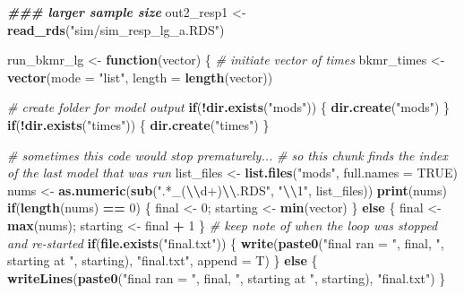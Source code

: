 \documentclass[12pt, twoside]{amherstthesis}
\newenvironment{Shaded}{\begin{snugshade}}{\end{snugshade}}
\newcommand{\AttributeTok}[1]{\textcolor[rgb]{0.13,0.29,0.53}{#1}}
\newcommand{\CommentTok}[1]{\textcolor[rgb]{0.56,0.35,0.01}{\textit{#1}}}
\newcommand{\ConstantTok}[1]{\textcolor[rgb]{0.56,0.35,0.01}{#1}}
\newcommand{\ControlFlowTok}[1]{\textcolor[rgb]{0.13,0.29,0.53}{\textbf{#1}}}
\newcommand{\DecValTok}[1]{\textcolor[rgb]{0.00,0.00,0.81}{#1}}
\newcommand{\DocumentationTok}[1]{\textcolor[rgb]{0.56,0.35,0.01}{\textbf{\textit{#1}}}}
\newcommand{\FunctionTok}[1]{\textcolor[rgb]{0.13,0.29,0.53}{\textbf{#1}}}
\newcommand{\NormalTok}[1]{#1}
\newcommand{\OtherTok}[1]{\textcolor[rgb]{0.56,0.35,0.01}{#1}}
\newcommand{\SpecialCharTok}[1]{\textcolor[rgb]{0.81,0.36,0.00}{\textbf{#1}}}
\newcommand{\StringTok}[1]{\textcolor[rgb]{0.31,0.60,0.02}{#1}}
\begin{document}
\scriptsize
\begin{Shaded}
\begin{Highlighting}[]
\DocumentationTok{\#\#\# larger sample size}
\NormalTok{out2\_resp1 }\OtherTok{\textless{}{-}} \FunctionTok{read\_rds}\NormalTok{(}\StringTok{"sim/sim\_resp\_lg\_a.RDS"}\NormalTok{)}

\NormalTok{run\_bkmr\_lg }\OtherTok{\textless{}{-}} \ControlFlowTok{function}\NormalTok{(vector) \{}
  \CommentTok{\# initiate vector of times}
\NormalTok{  bkmr\_times }\OtherTok{\textless{}{-}} \FunctionTok{vector}\NormalTok{(}\AttributeTok{mode =} \StringTok{"list"}\NormalTok{, }\AttributeTok{length =} \FunctionTok{length}\NormalTok{(vector))}
  
  \CommentTok{\# create folder for model output}
  \ControlFlowTok{if}\NormalTok{(}\SpecialCharTok{!}\FunctionTok{dir.exists}\NormalTok{(}\StringTok{"mods"}\NormalTok{)) \{}
    \FunctionTok{dir.create}\NormalTok{(}\StringTok{"mods"}\NormalTok{)}
\NormalTok{  \}}
  \ControlFlowTok{if}\NormalTok{(}\SpecialCharTok{!}\FunctionTok{dir.exists}\NormalTok{(}\StringTok{"times"}\NormalTok{)) \{}
    \FunctionTok{dir.create}\NormalTok{(}\StringTok{"times"}\NormalTok{)}
\NormalTok{  \}}
  
  \CommentTok{\# sometimes this code would stop prematurely...}
  \CommentTok{\# so this chunk finds the index of the last model that was run}
\NormalTok{  list\_files }\OtherTok{\textless{}{-}} \FunctionTok{list.files}\NormalTok{(}\StringTok{"mods"}\NormalTok{, }\AttributeTok{full.names =} \ConstantTok{TRUE}\NormalTok{)}
\NormalTok{  nums }\OtherTok{\textless{}{-}} \FunctionTok{as.numeric}\NormalTok{(}\FunctionTok{sub}\NormalTok{(}\StringTok{".*\_(}\SpecialCharTok{\textbackslash{}\textbackslash{}}\StringTok{d+)}\SpecialCharTok{\textbackslash{}\textbackslash{}}\StringTok{.RDS"}\NormalTok{, }\StringTok{"}\SpecialCharTok{\textbackslash{}\textbackslash{}}\StringTok{1"}\NormalTok{, list\_files))}
  \FunctionTok{print}\NormalTok{(nums)}
  \ControlFlowTok{if}\NormalTok{(}\FunctionTok{length}\NormalTok{(nums) }\SpecialCharTok{==} \DecValTok{0}\NormalTok{) \{}
\NormalTok{    final }\OtherTok{\textless{}{-}} \DecValTok{0}\NormalTok{; starting }\OtherTok{\textless{}{-}} \FunctionTok{min}\NormalTok{(vector)}
\NormalTok{  \} }\ControlFlowTok{else}\NormalTok{ \{}
\NormalTok{    final }\OtherTok{\textless{}{-}} \FunctionTok{max}\NormalTok{(nums); starting }\OtherTok{\textless{}{-}}\NormalTok{ final }\SpecialCharTok{+} \DecValTok{1}
\NormalTok{  \}}
  \CommentTok{\# keep note of when the loop was stopped and re{-}started}
  \ControlFlowTok{if}\NormalTok{(}\FunctionTok{file.exists}\NormalTok{(}\StringTok{"final.txt"}\NormalTok{)) \{}
    \FunctionTok{write}\NormalTok{(}\FunctionTok{paste0}\NormalTok{(}\StringTok{"final ran = "}\NormalTok{, final, }\StringTok{", starting at "}\NormalTok{, starting), }\StringTok{"final.txt"}\NormalTok{, }\AttributeTok{append =}\NormalTok{ T)}
\NormalTok{  \} }\ControlFlowTok{else}\NormalTok{ \{}
    \FunctionTok{writeLines}\NormalTok{(}\FunctionTok{paste0}\NormalTok{(}\StringTok{"final ran = "}\NormalTok{, final, }\StringTok{", starting at "}\NormalTok{, starting), }\StringTok{"final.txt"}\NormalTok{)}
\NormalTok{  \}}
  

\end{Highlighting}
\end{Shaded}
\end{document}
